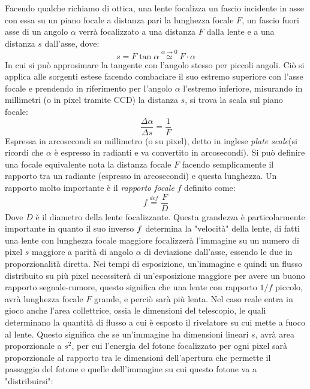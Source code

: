 \documentclass[a4paper,twoside,openany,notitlepage]{book}
\newcommand{\Def}{\overset{\mathit{def}}{=}}
\theoremstyle{definition}
\theoremstyle{plain}
\begin{document}
Facendo qualche richiamo di ottica, una lente focalizza un fascio incidente in asse con essa su un piano focale a distanza pari la lunghezza focale $F$, un fascio fuori asse di un angolo $\alpha$ verrà focalizzato a una distanza $F$ dalla lente e a una distanza $s$ dall'asse, dove:
\begin{equation*}
	s = F\tan\alpha \overset{\alpha\to0}{\simeq} F\cdot\alpha
\end{equation*}
In cui si può approsimare la tangente con l'angolo stesso per piccoli angoli. Ciò si applica alle sorgenti estese facendo combaciare il suo estremo superiore con l'asse focale e prendendo in riferimento per l'angolo $\alpha$ l'estremo inferiore, misurando in millimetri  (o in pixel tramite CCD) la distanza $s$, si trova la scala sul piano focale:
\begin{equation*}
	\frac{\Delta\alpha}{\Delta s} = \frac{1}{F}
\end{equation*}
Espressa in arcosecondi su millimetro (o su pixel), detto in inglese \textit{plate scale}(si ricordi che $\alpha$ è espresso in radianti e va convertito in arcosecondi). Si può definire una focale equivalente nota la distanza focale $F$ facendo semplicamente il rapporto tra un radiante (espresso in arcosecondi) e questa lunghezza. Un rapporto molto importante è il \textit{rapporto focale} $f$ definito come:
\begin{equation}
	\label{def:f-ratio}
	f \Def \frac{F}{D}
\end{equation}
Dove $D$ è il diametro della lente focalizzante. Questa grandezza è particolarmente importante in quanto il suo inverso $\/f$ determina la "velocità" della lente, di fatti una lente con lunghezza focale maggiore focalizzerà l'immagine su un numero di pixel $s$ maggiore a parità di angolo $\alpha$ di deviazione dall'asse, essendo le due in proporzionalità diretta. Nei tempi di esposizione, un'immagine e quindi un flusso distribuito su più pixel necessiterà di un'esposizione maggiore per avere un buono rapporto segnale-rumore, questo significa che una lente con rapporto $1/f$ piccolo, avrà lunghezza focale $F$ grande, e perciò sarà più lenta. Nel caso reale entra in gioco anche l'area collettrice, ossia le dimensioni del telescopio, le quali determinano la quantità di flusso a cui è esposto il rivelatore su cui mette a fuoco al lente. Questo significa che se un'immagine ha dimensioni lineari $s$, avrà area proporzionale a $s^2$, per cui l'energia del fotone focalizzato per ogni pixel sarà proporzionale al rapporto tra le dimensioni dell'apertura che permette il passaggio del fotone e quelle dell'immagine su cui questo fotone va a "distribuirsi":
\end{document}
